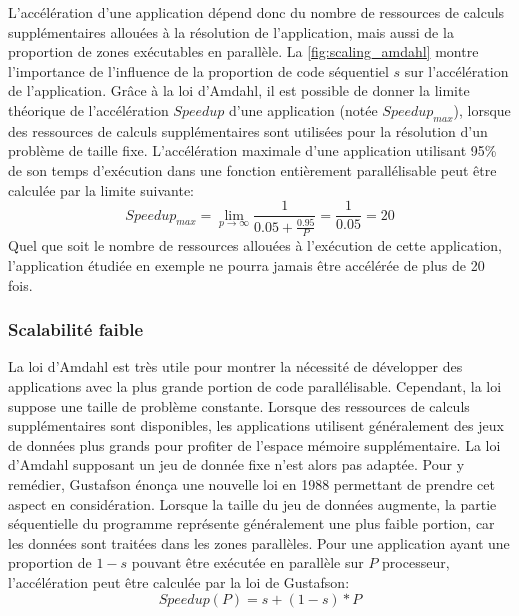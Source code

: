         L'accélération d'une application dépend donc du nombre de ressources de calculs supplémentaires allouées à la résolution de l'application, mais aussi de la proportion de zones exécutables en parallèle. La \autoref{fig:scaling_amdahl} montre l'importance de l'influence de la proportion de code séquentiel $s$ sur l'accélération de l'application. Grâce à la loi d'Amdahl, il est possible de donner la limite théorique de l'accélération $Speedup$ d'une application (notée $Speedup_{max}$),  lorsque des ressources de calculs supplémentaires sont utilisées pour la résolution d'un problème de taille fixe. L'accélération maximale d'une application utilisant 95\% de son temps d'exécution dans une fonction entièrement parallélisable peut être calculée par la limite suivante:         
        \begin{equation}
        Speedup_{max} =  \lim_{p\to\infty}    \frac{1}{0.05 + \frac{0.95}{P}} = \frac{1}{0.05} = 20         
        \end{equation}
        Quel que soit le nombre de ressources allouées à l'exécution de cette application, l'application étudiée en exemple ne pourra jamais être accélérée de plus de 20 fois.  
        
        
        
       
    \subsubsection{Scalabilité faible} 
        
        La loi d'Amdahl est très utile pour montrer la nécessité de développer des applications avec la plus grande portion de code parallélisable. Cependant, la loi suppose une taille de problème constante. Lorsque des ressources de calculs supplémentaires sont disponibles, les applications utilisent généralement des jeux de données plus grands pour profiter de l'espace mémoire supplémentaire. La loi d'Amdahl supposant un jeu de donnée fixe n'est alors pas adaptée. Pour y remédier, Gustafson énonça une nouvelle loi en 1988 \cite{Gustafson1988} permettant de prendre cet aspect en considération. 
        Lorsque la taille du jeu de données augmente, la partie séquentielle du programme représente généralement une plus faible portion, car les données sont traitées dans les zones parallèles. Pour une application ayant une proportion de $1-s$ pouvant être exécutée en parallèle sur $P$ processeur, l'accélération peut être calculée par la loi de Gustafson:         
        \begin{equation}
            Speedup (P) = s + (1-s) * P         
        \end{equation}
        
